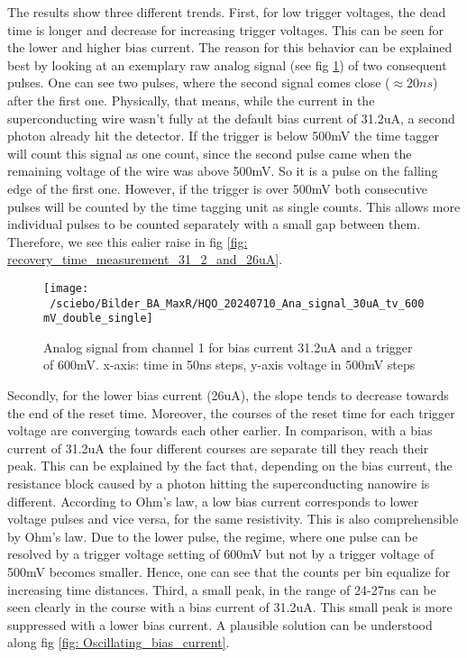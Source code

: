 The results show three different trends.
First, for low trigger voltages, the dead time is longer and decrease for increasing trigger voltages.
This can be seen for the lower and higher bias current.
The reason for this behavior can be explained best by looking at an exemplary raw analog signal (see fig \ref{fig: analog_signal_31_2_uA_double_peak})
of two consequent pulses.
One can see two pulses, where the second signal comes close ($\approx 20ns$) after the first one.
Physically, that means, while the current in the superconducting wire wasn't fully at the default bias current of
31.2uA, a second photon already hit the detector.
If the trigger is below 500mV the time tagger will count this signal as one count, since the second pulse came when
the remaining voltage of the wire was above 500mV.
So it is a pulse on the falling edge of the first one.
However, if the trigger is over 500mV both consecutive pulses will be counted by the time tagging unit as single counts.
This allows more individual pulses to be counted separately with a small gap between them. 
Therefore, we see this ealier raise in fig \ref{fig: recovery_time_measurement_31_2_and_26uA}.

\begin{figure}[H]
 \centering
 \texttt{[image: ~/sciebo/Bilder\_BA\_MaxR/HQO\_20240710\_Ana\_signal\_30uA\_tv\_600mV\_double\_single]}
 \caption{Analog signal from channel 1 for bias current 31.2uA and a trigger of 600mV. x-axis: time in 50ns steps, y-axis
 voltage in 500mV steps}
 \label{fig: analog_signal_31_2_uA_double_peak}
\end{figure}

Secondly, for the lower bias current (26uA), the slope tends to decrease towards the end of the reset time.
Moreover, the courses of the reset time for each trigger voltage are converging towards each other earlier.
In comparison, with a bias current of 31.2uA the four different courses are separate till they reach their peak.
This can be explained by the fact that, depending on the bias current, the resistance block caused by a
photon hitting the superconducting nanowire is different.
According to Ohm's law, a low bias current corresponds to lower voltage pulses and vice versa, for the same resistivity.
This is also comprehensible by Ohm's law.
Due to the lower pulse, the regime, where one pulse can be resolved by a trigger voltage setting of 600mV but not by a
trigger voltage of 500mV becomes smaller.
Hence, one can see that the counts per bin equalize for increasing time distances.
Third, a small peak, in the range of 24-27ns can be seen clearly in the course with a bias current of 31.2uA.
This small peak is more suppressed with a lower bias current.
A plausible solution can be understood along fig \ref{fig: Oscillating_bias_current}.

